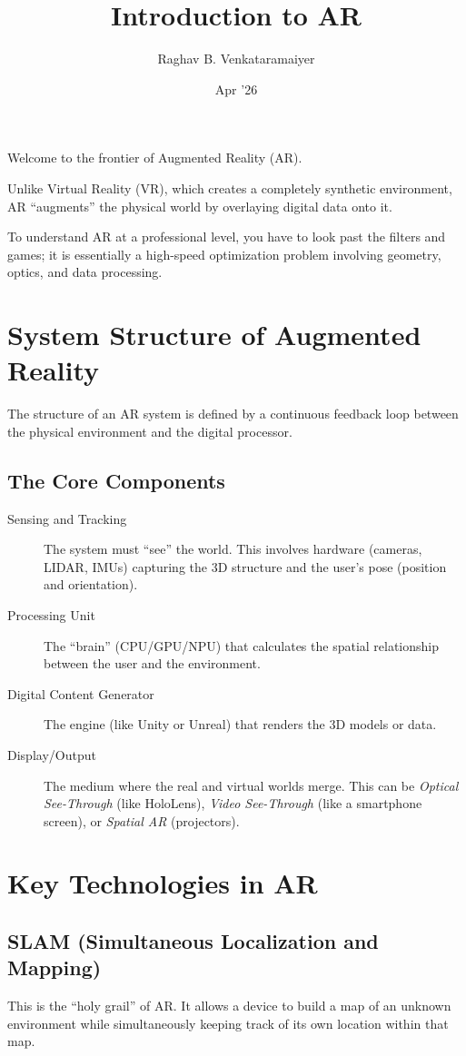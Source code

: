 \documentclass[11pt]{article}
\author{Raghav B. Venkataramaiyer}
\date{Apr '26}
\title{Introduction to AR}
\begin{document}
\maketitle
\setcounter{tocdepth}{2}
\tableofcontents

Welcome to the frontier of Augmented Reality (AR).

Unlike Virtual Reality (VR), which creates a completely
synthetic environment, AR ``augments'' the physical world
by overlaying digital data onto it.

To understand AR at a professional level, you have to
look past the filters and games; it is essentially a
high-speed optimization problem involving geometry,
optics, and data processing.
\section{System Structure of Augmented Reality}
\label{sec:org36551f4}
The structure of an AR system is defined by a
continuous feedback loop between the physical
environment and the digital processor.
\subsection{The Core Components}
\label{sec:org63a975a}

\begin{description}
\item[{Sensing and Tracking}] The system must ``see'' the
world. This involves hardware (cameras, LIDAR, IMUs)
capturing the 3D structure and the user's pose
(position and orientation).
\item[{Processing Unit}] The ``brain'' (CPU/GPU/NPU) that
calculates the spatial relationship between the user
and the environment.
\item[{Digital Content Generator}] The engine (like Unity
or Unreal) that renders the 3D models or data.
\item[{Display/Output}] The medium where the real and
virtual worlds merge. This can be \emph{Optical
See-Through} (like HoloLens), \emph{Video See-Through}
(like a smartphone screen), or \emph{Spatial AR}
(projectors).
\end{description}
\section{Key Technologies in AR}
\label{sec:orgcbbf493}

\subsection{SLAM (Simultaneous Localization and Mapping)}
\label{sec:orge91ff18}
This is the ``holy grail'' of AR. It allows a device to
build a map of an unknown environment while
simultaneously keeping track of its own location within
that map.
\end{document}
